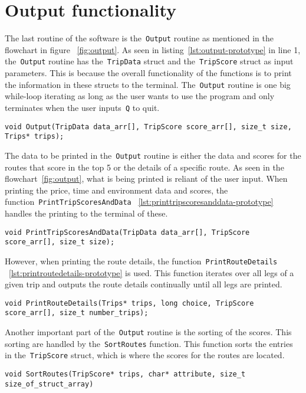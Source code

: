 \section{Output functionality}\label{sec:output-functionality}

The last routine of the software is the~\texttt{Output} routine as mentioned in the flowchart in figure
~\ref{fig:output}.
As seen in listing~\ref{lst:output-prototype} in line 1, the~\texttt{Output} routine has the~\texttt{TripData} struct
and the~\texttt{TripScore} struct as input parameters.
This is because the overall functionality of the functions is to print the information in these structs to the terminal.
The~\texttt{Output} routine is one big while-loop iterating as long as the user wants to use the program and only
terminates when the user inputs~\texttt{Q} to quit.

\begin{lstlisting}[caption={Function prototype for~\texttt{Output}}, label={lst:output-prototype}, captionpos=b]
void Output(TripData data_arr[], TripScore score_arr[], size_t size, Trips* trips);
\end{lstlisting}

The data to be printed in the~\texttt{Output} routine is either the data and scores for the routes that score in the top
5 or the details of a specific route.
As seen in the flowchart~\ref{fig:output}, what is being printed is reliant of the user input.
When printing the price, time and environment data and scores, the function~\texttt{PrintTripScoresAndData}
~\ref{lst:printtripscoresanddata-prototype} handles the printing to the terminal of these.

\begin{lstlisting}[caption={Function prototype for~\texttt{PrintTripScoresAndData}},
    label={lst:printtripscoresanddata-prototype}, captionpos=b]
void PrintTripScoresAndData(TripData data_arr[], TripScore score_arr[], size_t size);
\end{lstlisting}

However, when printing the route details, the function~\texttt{PrintRouteDetails}
~\ref{lst:printroutedetails-prototype} is used.
This function iterates over all legs of a given trip and outputs the route details continually until all legs are
printed.

\begin{lstlisting}[caption={Function prototype for~\texttt{PrintRouteDetails}},
    label={lst:printroutedetails-prototype}, captionpos=b]
void PrintRouteDetails(Trips* trips, long choice, TripScore score_arr[], size_t number_trips);
\end{lstlisting}

Another important part of the~\texttt{Output} routine is the sorting of the scores.
This sorting are handled by the~\texttt{SortRoutes} function.
This function sorts the entries in the~\texttt{TripScore} struct, which is where the scores for the routes are located.

\begin{lstlisting}[caption={Function prototype for~\texttt{SortRoutes}}, label={lst:sortroutes-prototype},
    captionpos=b]
void SortRoutes(TripScore* trips, char* attribute, size_t size_of_struct_array)
\end{lstlisting}
